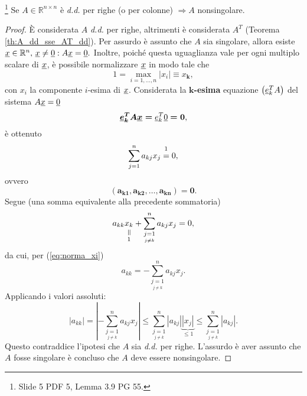 \begin{theorem}\label{th:matrice_diagonale_dominante_nonsingolare}\footnote{Slide 5 PDF 5, Lemma 3.9 PG 55.}
    Se $A\in\mathbb{R}^{n\times n}$ è \textit{d.d.} per righe (o per colonne) $\Rightarrow A$ \gls{nonsingolare}.
\end{theorem}
\begin{proof}
    È considerata $A$ \textit{d.d.} per righe, altrimenti è considerata $A^T$ (Teorema \ref{th:A_dd_sse_AT_dd}). Per assurdo è assunto che $A$ sia \gls{singolare}, allora esiste $\uline x\in\mathbb R^n,\, \uline x\neq\uline 0: A\uline x=\uline 0.$ Inoltre, poiché questa uguaglianza vale per ogni multiplo scalare di $\uline x$, è possibile normalizzare $\uline x$ in modo tale che 
    \begin{equation}\label{eq:norma_xi}
       1 = \underset{i=1,\hdots,n}{\max}|x_i|\equiv x_{\boldsymbol k}, 
    \end{equation}
    con $x_i$ la componente $i$-esima di $\uline x$. Considerata la $\boldsymbol{k}$\textbf{-esima} equazione $\left( \uline e_k^T A \right)$ del sistema $A\uline x=\uline 0$
    \begin{equation*}
    	\boldsymbol{\uline e_k^T A \uline x=}\uline e_k^T\uline 0 \boldsymbol{= 0},
    \end{equation*}
    è ottenuto
    \begin{equation*}
        \sum_{j=1}^n a_{kj}x_j \overset{\footnotemark}{=} 0,
    \end{equation*}
    ovvero
    \begin{equation*}
    	\boldsymbol{(a_{k1}, a_{k2},\hdots, a_{kn})=0}.
    \end{equation*}
    Segue (una somma equivalente alla precedente sommatoria)
    \begin{equation*}
        a_{kk}\equalto{x_k}{1} +  \sum_{\underset{ j\neq k}{j=1}}^n a_{kj}x_j=0,
    \end{equation*}
    da cui, per (\ref{eq:norma_xi})
    \begin{equation*}
        a_{kk}= -\sum_{\underset{ j\neq k}{j=1}}^n a_{kj}x_j.
    \end{equation*}
    Applicando i valori assoluti:
    \begin{equation*}
        |a_{kk}|=\left|-\sum_{\underset{ j\neq k}{j=1}}^n a_{kj}x_j\right|\leq \sum_{\underset{ j\neq k}{j=1}}^n |a_{kj}|\underbrace{|x_j|}_{\leq 1}\leq \sum_{\underset{ j\neq k}{j=1}}^n |a_{kj}|.
    \end{equation*}
    Questo contraddice l'ipotesi che $A$ sia \textit{d.d.} per righe. L'assurdo è aver assunto che $A$ fosse \gls{singolare} è concluso che $A$ deve essere \gls{nonsingolare}.
\end{proof}

